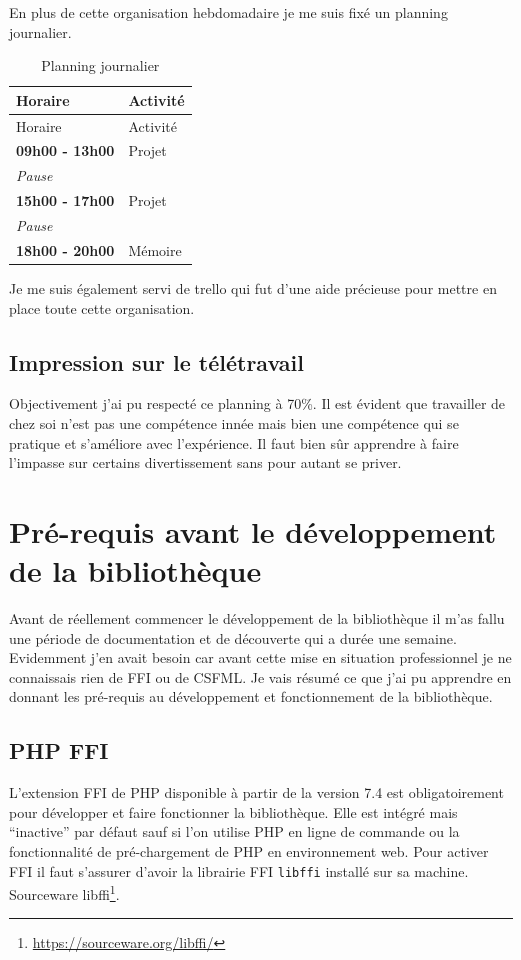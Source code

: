 \documentclass[11pt,a4paper,krantz2,11pt,oneside]{krantz}
\renewcommand{\href}[2]{#2\footnote{\url{#1}}}
\begin{document}
En plus de cette organisation hebdomadaire je me suis fixé un planning journalier.

\begin{longtable}[]{@{}ll@{}}
\caption{\label{tab:planning} Planning journalier}\tabularnewline
\toprule
Horaire & Activité\tabularnewline
\midrule
\endfirsthead
\toprule
Horaire & Activité\tabularnewline
\midrule
\endhead
\textbf{09h00 - 13h00} & Projet\tabularnewline
\emph{Pause} &\tabularnewline
\textbf{15h00 - 17h00} & Projet\tabularnewline
\emph{Pause} &\tabularnewline
\textbf{18h00 - 20h00} & Mémoire\tabularnewline
\bottomrule
\end{longtable}

Je me suis également servi de trello qui fut d'une aide précieuse pour mettre en place toute cette organisation.

\hypertarget{impression-sur-le-tuxe9luxe9travail}{%
\subsection{Impression sur le télétravail}\label{impression-sur-le-tuxe9luxe9travail}}

Objectivement j'ai pu respecté ce planning à 70\%. Il est évident que travailler de chez soi n'est pas une compétence innée mais bien une compétence qui se pratique et s'améliore avec l'expérience. Il faut bien sûr apprendre à faire l'impasse sur certains divertissement sans pour autant se priver.

\hypertarget{pre-requis}{%
\section{Pré-requis avant le développement de la bibliothèque}\label{pre-requis}}

Avant de réellement commencer le développement de la bibliothèque il m'as fallu une période de documentation et de découverte qui a durée une semaine. Evidemment j'en avait besoin car avant cette mise en situation professionnel je ne connaissais rien de FFI ou de CSFML. Je vais résumé ce que j'ai pu apprendre en donnant les pré-requis au développement et fonctionnement de la bibliothèque.

\hypertarget{php-ffi}{%
\subsection{PHP FFI}\label{php-ffi}}

L'extension FFI de PHP disponible à partir de la version 7.4 est obligatoirement pour développer et faire fonctionner la bibliothèque. Elle est intégré mais ``inactive'' par défaut \citep{the_php_group_ffi_2019} sauf si l'on utilise PHP en ligne de commande ou la fonctionnalité de pré-chargement de PHP en environnement web. Pour activer FFI il faut s'assurer d'avoir la librairie FFI \texttt{libffi} installé sur sa machine. \href{https://sourceware.org/libffi/}{Sourceware libffi}.
\end{document}
